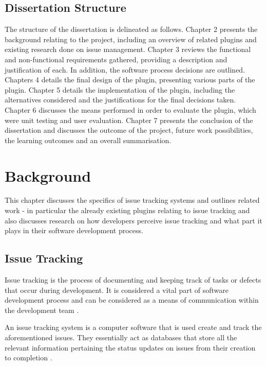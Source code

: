 \documentclass{4thYearProject}
\begin{document}
\section{Dissertation Structure}

The structure of the dissertation is delineated as follows. Chapter 2 presents the background relating to the project, including an overview of related plugins and existing research done on issue management. Chapter 3 reviews the functional and non-functional requirements gathered, providing a description and justification of each. In addition, the software process decisions are outlined. Chapters 4 details the final design of the plugin, presenting various parts of the plugin. Chapter 5 details the implementation of the plugin, including the alternatives considered and the justifications for the final decisions taken. Chapter 6 discusses the means performed in order to evaluate the plugin, which were unit testing and user evaluation. Chapter 7 presents the conclusion of the dissertation and discusses the outcome of the project, future work possibilities, the learning outcomes and an overall summarisation. 


\chapter{Background}

This chapter discusses the specifics of issue tracking systems and outlines related work - in particular the already existing plugins relating to issue tracking and also discusses research on how developers perceive issue tracking and what part it plays in their software development process.

\section{Issue Tracking}

Issue tracking is the process of documenting and keeping track of tasks or defects that occur during development. It is considered a vital part of software development process and can be considered as a means of communication within the development team \cite{socialnature}. 

An issue tracking system is a computer software that is used create and track the aforementioned issues. They essentially act as databases that store all the relevant information pertaining the status updates on issues from their creation to completion \cite{socialnature}. 
\end{document}
